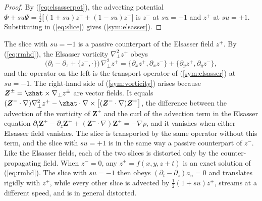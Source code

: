 \begin{proof}
By (\ref{eq:elsasserpot}), the advecting potential $\Phi+su\Psi=\frac12\big[(1+su)z^++(1-su)z^-\big]$ is $z^-$ at $su=-1$ and $z^+$ at $su=+1$. Substituting in (\ref{eq:slice}) gives (\ref{sym:elsasser}).
\end{proof}

The slice with $su=-1$ is a passive counterpart of the Elsasser field $z^+$. By (\ref{eq:rmhd}), the Elsasser vorticity $\nabla_\perp^2z^+$ obeys
\begin{equation}\label{sym:vorticity}
  \big(\partial_t-\partial_z+\{z^-,\cdot\}\big)\,\nabla_\perp^2z^+
  =\{\partial_xz^+,\partial_xz^-\}+\{\partial_yz^+,\partial_yz^-\},
\end{equation}
and the operator on the left is the transport operator of (\ref{sym:elsasser}) at $su=-1$. The right-hand side of (\ref{sym:vorticity}) arises because $\boldsymbol Z^\pm=\zhat\times\nabla_\perp z^\pm$ are vector fields. It equals $(\boldsymbol Z^-\cdot\nabla)\nabla_\perp^2z^+-\zhat\cdot\nabla\times\big[(\boldsymbol Z^-\cdot\nabla)\boldsymbol Z^+\big]$, the difference between the advection of the vorticity of $\boldsymbol Z^+$ and the curl of the advection term in the Elsasser equation $\partial_t\boldsymbol Z^+-\partial_z\boldsymbol Z^++(\boldsymbol Z^-\cdot\nabla)\boldsymbol Z^+=-\nabla p$, and it vanishes when either Elsasser field vanishes. The slice is transported by the same operator without this term, and the slice with $su=+1$ is in the same way a passive counterpart of $z^-$. Like the Elsasser fields, each of the two slices is distorted only by the counter-propagating field. When $z^-=0$, any $z^+=f(x,y,z+t)$ is an exact solution of (\ref{eq:rmhd}). The slice with $su=-1$ then obeys $(\partial_t-\partial_z)a_u=0$ and translates rigidly with $z^+$, while every other slice is advected by $\frac12(1+su)z^+$, streams at a different speed, and is in general distorted.

